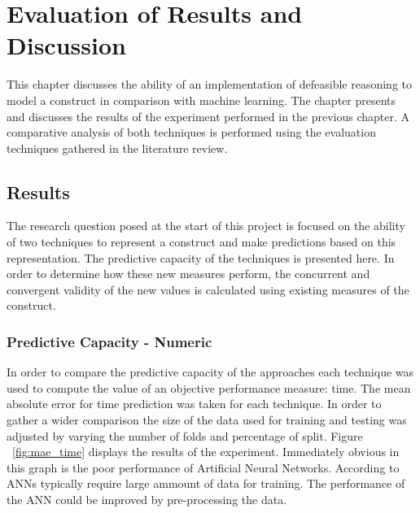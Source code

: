 
\chapter{Evaluation of Results and Discussion} %

\label{Chapter5} %


This chapter discusses the ability of an implementation of defeasible reasoning to model a construct in comparison with machine learning. The chapter presents and discusses the results of the experiment performed in the previous chapter. A comparative analysis of both techniques is performed using the evaluation techniques gathered in the literature review.

\section{Results}

The research question posed at the start of this project is focused on the ability of two techniques to represent a construct and make predictions based on this representation. The predictive capacity of the techniques is presented here. In order to determine how these new measures perform, the concurrent and convergent validity of the new values is calculated using existing measures of the construct. 

\subsection{Predictive Capacity - Numeric}

In order to compare the predictive capacity of the approaches each technique was used to compute the value of an objective performance measure: time. The mean absolute error for time prediction was taken for each technique. In order to gather a wider comparison the size of the data used for training and testing was adjusted by varying the number of folds and percentage of split. Figure ~\ref{fig:mae_time} displays the results of the experiment. Immediately obvious in this graph is the poor performance of Artificial Neural Networks. According to \cite{silvert2000can} ANNs typically require large ammount of data for training. The performance of the ANN could be improved by pre-processing the data. 

